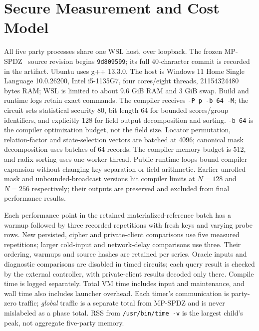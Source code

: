 \documentclass[journal,onecolumn]{IEEEtran}
\begin{document}
\section{Secure Measurement and Cost Model}
All five party processes share one WSL host, over loopback. The frozen MP-SPDZ~\cite{keller2020mpspdz} source revision begins \texttt{9d809599}; its full 40-character commit is recorded in the artifact. Ubuntu uses g++ 13.3.0. The host is Windows 11 Home Single Language 10.0.26200, Intel i5-1135G7, four cores/eight threads, 21154324480 bytes RAM; WSL is limited to about 9.6 GiB RAM and 3 GiB swap. Build and runtime logs retain exact commands. The compiler receives \texttt{-P p -b 64 -M}; the circuit sets statistical security 80, bit length 64 for bounded scores/group identifiers, and explicitly 128 for field output decomposition and sorting. \texttt{-b 64} is the compiler optimization budget, not the field size. Locator permutation, relation-factor and state-selection vectors are batched at 4096; canonical mask decomposition uses batches of 64 records. The compiler memory budget is 512, and radix sorting uses one worker thread. Public runtime loops bound compiler expansion without changing key separation or field arithmetic. Earlier unrolled-mask and unbounded-broadcast versions hit compiler limits at $N=128$ and $N=256$ respectively; their outputs are preserved and excluded from final performance results.

Each performance point in the retained materialized-reference batch has a warmup followed by three recorded repetitions with fresh keys and varying probe rows. New persisted, cipher and private-client comparisons use five measured repetitions; larger cold-input and network-delay comparisons use three. Their ordering, warmups and source hashes are retained per series. Oracle inputs and diagnostic comparisons are disabled in timed circuits; each query result is checked by the external controller, with private-client results decoded only there. Compile time is logged separately. Total VM time includes input and maintenance, and wall time also includes launcher overhead. Each timer's communication is party-zero traffic; \emph{global} traffic is a separate total from MP-SPDZ and is never mislabeled as a phase total. RSS from \texttt{/usr/bin/time -v} is the largest child's peak, not aggregate five-party memory.
\end{document}
